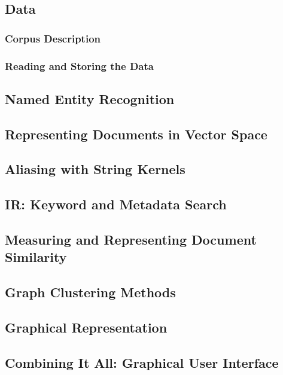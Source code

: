 \subsection{Data}\label{sec:data}
\subsubsection{Corpus Description}\label{sec:description_of_the_castro_archive}

\subsubsection{Reading and Storing the Data}\label{sec:reading_and_storing_the_data}

\subsection{Named Entity Recognition}\label{sec:stanford_named_entity_recognizer}


\subsection{Representing Documents in Vector Space}\label{sec:representing_documents_in_vector_space}


\subsection{Aliasing with String Kernels}\label{sec:aliasing}


\subsection{IR: Keyword and Metadata Search}\label{sec:ir}


\subsection{Measuring and Representing Document Similarity}\label{sec:docsim}


\subsection{Graph Clustering Methods}\label{sec:graph_clustering_methods}


\subsection{Graphical Representation}\label{sec:graphical_representation}


\subsection{Combining It All: Graphical User Interface}\label{sec:gui}

